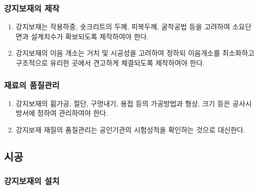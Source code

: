 \subsubsection{강지보재의 제작}
\begin{enumerate}
\item 강지보재는 작용하중, 숏크리트의 두께, 피복두께, 굴착공법 등을 고려하여 소요단면과 설계치수가 확보되도록 제작하여야 한다.  
\item 강지보재의 이음 개소는 거치 및 시공성을 고려하여 정하되 이음개소를 최소화하고 구조적으로 유리한 곳에서 견고하게 체결되도록 제작하여야 한다.  
\end{enumerate}

\subsubsection{재료의 품질관리}
\begin{enumerate}
\item 강지보재의 휨가공, 절단, 구멍내기, 용접 등의 가공방법과 형상, 크기 등은 공사시방서에 정하여 관리하여야 한다.  
\item 강지보재 재질의 품질관리는 공인기관의 시험성적을 확인하는 것으로 대신한다.  
\end{enumerate}


\newpage
\subsection{시공}

\subsubsection{강지보재의 설치}

